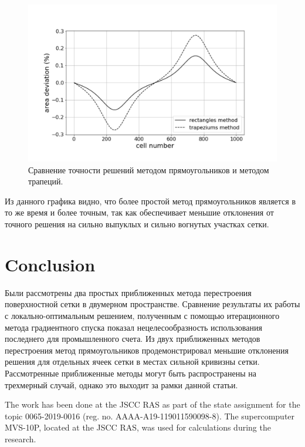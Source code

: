 \documentclass[
11pt,%
tightenlines,%
twoside,%
onecolumn,%
nofloats,%
nobibnotes,%
nofootinbib,%
superscriptaddress,%
noshowpacs,%
centertags]%
{revtex4}
\begin{document}
\begin{figure}[h]
\setcaptionmargin{5mm}
\onelinecaptionstrue
\includegraphics[width=1.0\textwidth]{pics/graphic.pdf}
\caption{Сравнение точности решений методом прямоугольников и методом трапеций.}
\label{fig:graphic}
\end{figure}

Из данного графика видно, что более простой метод прямоугольников является в то же время и более точным, так как обеспечивает меньшие отклонения от точного решения на сильно выпуклых и сильно вогнутых участках сетки.

\section{Conclusion}

Были рассмотрены два простых приближенных метода перестроения поверхностной сетки в двумерном пространстве.
Сравнение результаты их работы с локально-оптимальным решением, полученным с помощью итерационного метода градиентного спуска показал нецелесообразность использования последнего для промышленного счета.
Из двух приближенных методов перестроения метод прямоугольников продемонстрировал меньшие отклонения решения для отдельных ячеек сетки в местах сильной кривизны сетки.
Рассмотренные приближенные методы могут быть распространены на трехмерный случай, однако это выходит за рамки данной статьи.

\begin{acknowledgments}
The work has been done at the JSCC RAS as part of the state assignment for the topic 0065-2019-0016 (reg. no. AAAA-A19-119011590098-8). The supercomputer MVS-10P, located at the JSCC RAS, was used for calculations during the research.
\end{acknowledgments}
\end{document}
